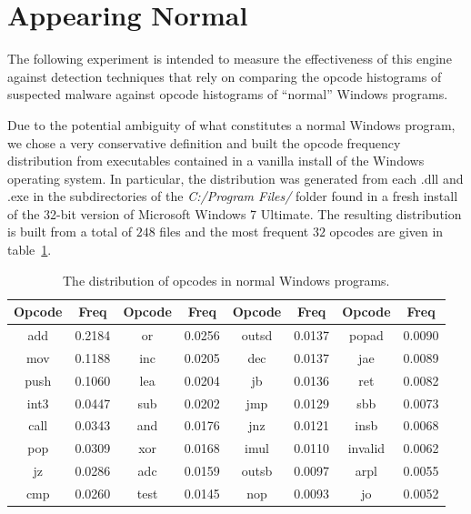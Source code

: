 \section{Appearing Normal}

    The following experiment is intended to measure the effectiveness of
    this engine against detection techniques that rely on comparing the
    opcode histograms of suspected malware against opcode histograms of
    ``normal'' Windows programs.

    Due to the potential ambiguity of what constitutes a normal Windows
    program, we chose a very conservative definition and built the opcode
    frequency distribution from executables contained in a vanilla install
    of the Windows operating system. In particular, the distribution was
    generated from each {.dll} and {.exe} in the subdirectories of the
    \emph{C:/Program Files/} folder found in a fresh install of the 32-bit
    version of Microsoft Windows 7 Ultimate. The resulting distribution is
    built from a total of $248$ files and the most frequent $32$ opcodes are
    given in table~\ref{tab:results-opcode-dist}.

    \begin{table}
        \centering
        \begin{tabular}{|c|c||c|c||c|c||c|c|}
            \hline
            Opcode & Freq & Opcode & Freq & Opcode & Freq & Opcode & Freq \\
            \hline
            add & 0.2184 & or & 0.0256 & outsd & 0.0137 & popad & 0.0090 \\
            \hline
            mov & 0.1188 & inc & 0.0205 & dec & 0.0137 & jae & 0.0089 \\
            \hline
           push & 0.1060 & lea & 0.0204 & jb & 0.0136 & ret & 0.0082 \\
            \hline
           int3 & 0.0447 & sub & 0.0202 & jmp & 0.0129 & sbb & 0.0073 \\
            \hline
           call & 0.0343 & and & 0.0176 & jnz & 0.0121 & insb & 0.0068 \\
            \hline
            pop & 0.0309 & xor & 0.0168 & imul & 0.0110 & invalid & 0.0062 \\ 
            \hline
             jz & 0.0286 & adc & 0.0159 & outsb & 0.0097 & arpl & 0.0055 \\ 
            \hline
            cmp & 0.0260 & test & 0.0145 & nop & 0.0093 & jo & 0.0052 \\
            \hline
        \end{tabular}
        \caption{The distribution of opcodes in normal Windows programs.}
        \label{tab:results-opcode-dist}
    \end{table}

